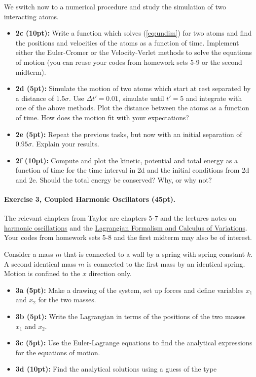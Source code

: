 \documentclass[%
oneside,                 %
final,                   %
10pt]{article}
\begin{document}
\noindent
We switch now to a numerical procedure and study the simulation of two interacting atoms.
\begin{itemize}
\item \textbf{2c (10pt):} Write a function which solves (\ref{eq:undim}) for two atoms and find the positions and velocities of the atoms as a function of time. Implement either the Euler-Cromer or the Velocity-Verlet methods to solve the equations of motion (you can reuse your codes from homework sets 5-9 or the second midterm).

\item \textbf{2d (5pt):} Simulate the motion of two atoms which start at rest separated by a distance of ${1.5}\sigma$. Use $\Delta t'={0.01}$, simulate until $t'=5$ and integrate with one of the above methods. Plot the distance between the atoms as a function of time. How does the motion fit with your expectations?

\item \textbf{2e (5pt):} Repeat the previous tasks, but now with an initial separation of $0.95\sigma$. Explain your results.

\item \textbf{2f (10pt):} Compute and plot the kinetic, potential and total energy as a function of time for the time interval in 2d and the initial conditions from 2d and 2e. Should the total energy be conserved? Why, or why not? 
\end{itemize}

\noindent
\paragraph{Exercise 3, Coupled Harmonic Oscillators (45pt).}
The relevant chapters from Taylor are chapters 5-7 and the lectures notes on \href{{https://mhjensen.github.io/Physics321/doc/LectureNotes/_build/html/chapter5.html}}{harmonic oscillations} and the \href{{https://mhjensen.github.io/Physics321/doc/LectureNotes/_build/html/chapter8.html}}{Lagrangian Formalism and Calculus of Variations}. Your codes from homework sets 5-8 and the first midterm may also be of interest.

Consider a mass $m$ that is connected to a wall by a spring with
spring constant $k$. A second identical mass $m$ is connected to the
first mass by an identical spring. Motion is confined to the $x$ direction only.

\begin{itemize}
\item \textbf{3a (5pt):} Make a drawing of the system, set up forces and define variables $x_1$ and $x_2$ for the two masses.

\item \textbf{3b (5pt):} Write the Lagrangian in terms of the positions of the two masses $x_1$ and $x_2$.

\item \textbf{3c (5pt):} Use the Euler-Lagrange equations to find the analytical expressions for the  equations of motion.

\item \textbf{3d (10pt):} Find the analytical  solutions using a guess of  the type
\end{itemize}
\end{document}
